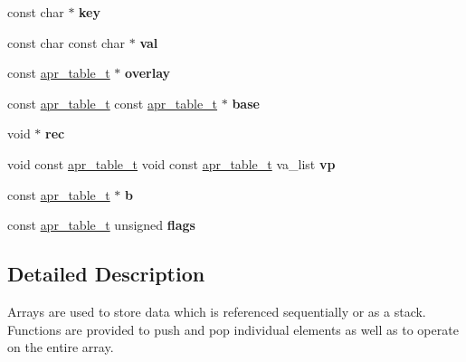 \begin{DoxyCompactItemize}
\mbox{\label{group__apr__tables_gacd3d88da3c0e0313c3645ff34f62f542}} 
const char $\ast$ {\bfseries key}
\item 
\mbox{\label{group__apr__tables_ga4d708cd93abeca73400ed82977502830}} 
const char const char $\ast$ {\bfseries val}
\item 
\mbox{\label{group__apr__tables_ga13c7c35ef67602a57343d21ee1d62e61}} 
const \mbox{\hyperlink{group__apr__tables_gad7ea82d6608a4a633fc3775694ab71e4}{apr\+\_\+table\+\_\+t}} $\ast$ {\bfseries overlay}
\item 
\mbox{\label{group__apr__tables_ga74964146831939c658b798439fc32f6d}} 
const \mbox{\hyperlink{group__apr__tables_gad7ea82d6608a4a633fc3775694ab71e4}{apr\+\_\+table\+\_\+t}} const \mbox{\hyperlink{group__apr__tables_gad7ea82d6608a4a633fc3775694ab71e4}{apr\+\_\+table\+\_\+t}} $\ast$ {\bfseries base}
\item 
\mbox{\label{group__apr__tables_gafcb9c0f7671f566c4804fa8bbad43c4b}} 
void $\ast$ {\bfseries rec}
\item 
\mbox{\label{group__apr__tables_ga8ca169f10741c89e389d179f952e4dc9}} 
void const \mbox{\hyperlink{group__apr__tables_gad7ea82d6608a4a633fc3775694ab71e4}{apr\+\_\+table\+\_\+t}} void const \mbox{\hyperlink{group__apr__tables_gad7ea82d6608a4a633fc3775694ab71e4}{apr\+\_\+table\+\_\+t}} va\+\_\+list {\bfseries vp}
\item 
\mbox{\label{group__apr__tables_gac7465df964235e37c6f5e1212af22be2}} 
const \mbox{\hyperlink{group__apr__tables_gad7ea82d6608a4a633fc3775694ab71e4}{apr\+\_\+table\+\_\+t}} $\ast$ {\bfseries b}
\item 
\mbox{\label{group__apr__tables_ga8b08a4d2ec878257d64c55f64a62242c}} 
const \mbox{\hyperlink{group__apr__tables_gad7ea82d6608a4a633fc3775694ab71e4}{apr\+\_\+table\+\_\+t}} unsigned {\bfseries flags}
\end{DoxyCompactItemize}


\subsection{Detailed Description}
Arrays are used to store data which is referenced sequentially or as a stack. Functions are provided to push and pop individual elements as well as to operate on the entire array.

